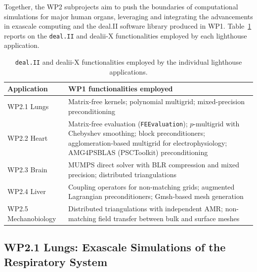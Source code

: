 \documentclass[a4paper,12pt, numbers]{article}
\newcommand{\dealii}{\texttt{deal.II}}
\begin{document}
Together, the WP2 subprojects aim to push the boundaries of computational simulations for major human organs, leveraging and integrating the advancements in exascale computing and the deal.II software library produced in WP1. Table~\ref{tab:wp1wp2} reports on the  \dealii{} and dealii-X functionalities employed by each lighthouse application.

\begin{table}[htbp]
	\centering
	\caption{\dealii{} and dealii-X functionalities employed by the individual lighthouse applications.}
        \label{tab:wp1wp2}
        \medskip
	\renewcommand{\arraystretch}{1.2}
	\footnotesize
	\begin{tabular}{p{3.0cm}p{11.0cm}}
		\toprule
		\textbf{Application} & \textbf{WP1 functionalities employed} \\
		\midrule
		WP2.1 Lungs & Matrix-free kernels; polynomial multigrid; mixed-precision preconditioning \\
		\midrule
		WP2.2 Heart & Matrix-free evaluation (\texttt{FEEvaluation}); $p$-multigrid with Chebyshev smoothing; block preconditioners; agglomeration-based multigrid for electrophysiology; AMG4PSBLAS (PSCToolkit) preconditioning\footnotemark[1] \\
		\midrule
		WP2.3 Brain & MUMPS direct solver with BLR compression and mixed precision; distributed triangulations \\
		\midrule
		WP2.4 Liver  & Coupling operators for non-matching grids; augmented Lagrangian preconditioners; Gmsh-based mesh generation \\
		\midrule
		WP2.5 Mechanobiology  & Distributed triangulations with independent AMR; non-matching field transfer between bulk and surface meshes \\
		\bottomrule
	\end{tabular}
\end{table}






\subsection{WP2.1 Lungs: Exascale Simulations of the Respiratory System}
\end{document}
